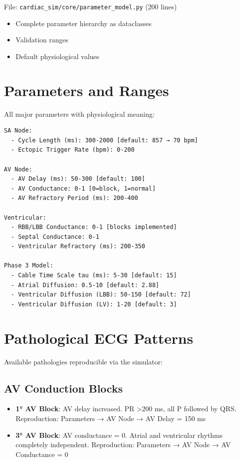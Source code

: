 \documentclass[12pt,a4paper]{article}
\begin{document}
File: \texttt{cardiac\_sim/core/parameter\_model.py} (200 lines)
\begin{itemize}
\item Complete parameter hierarchy as dataclasses
\item Validation ranges
\item Default physiological values
\end{itemize}

\section*{Parameters and Ranges}

All major parameters with physiological meaning:

\begin{verbatim}
SA Node:
  - Cycle Length (ms): 300-2000 [default: 857 → 70 bpm]
  - Ectopic Trigger Rate (bpm): 0-200

AV Node:
  - AV Delay (ms): 50-300 [default: 100]
  - AV Conductance: 0-1 [0=block, 1=normal]
  - AV Refractory Period (ms): 200-400

Ventricular:
  - RBB/LBB Conductance: 0-1 [blocks implemented]
  - Septal Conductance: 0-1
  - Ventricular Refractory (ms): 200-350

Phase 3 Model:
  - Cable Time Scale tau (ms): 5-30 [default: 15]
  - Atrial Diffusion: 0.5-10 [default: 2.88]
  - Ventricular Diffusion (LBB): 50-150 [default: 72]
  - Ventricular Diffusion (LV): 1-20 [default: 3]
\end{verbatim}

\section*{Pathological ECG Patterns}

Available pathologies reproducible via the simulator:

\subsection*{AV Conduction Blocks}

\begin{itemize}
\item \textbf{1° AV Block}: AV delay increased. PR >200 ms, all P followed by QRS.
  Reproduction: Parameters → AV Node → AV Delay = 150 ms

\item \textbf{3° AV Block}: AV conductance = 0. Atrial and ventricular rhythms completely independent.
  Reproduction: Parameters → AV Node → AV Conductance = 0

\end{itemize}
\end{document}
